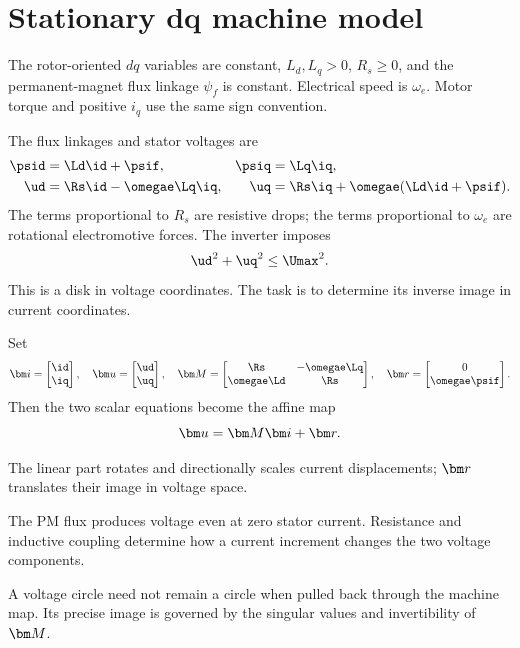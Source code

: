 \section{Stationary dq machine model}

\begin{assumption}
The rotor-oriented $dq$ variables are constant, $L_d,L_q>0$, $R_s\geq0$, and
the permanent-magnet flux linkage $\psi_f$ is constant.  Electrical speed is
$\omega_e$.  Motor torque and positive $i_q$ use the same sign convention.
\end{assumption}

The flux linkages and stator voltages are
\begin{align}
 \psid&=\Ld\id+\psif, & \psiq&=\Lq\iq,\label{eq:psm-flux}\\
 \ud&=\Rs\id-\omegae\Lq\iq, &
 \uq&=\Rs\iq+\omegae(\Ld\id+\psif).\label{eq:psm-voltage-model}
\end{align}
The terms proportional to $R_s$ are resistive drops; the terms proportional
to $\omega_e$ are rotational electromotive forces.  The inverter imposes
\begin{equation}
 \ud^2+\uq^2\leq\Umax^2.\label{eq:voltage-ball}
\end{equation}
This is a disk in voltage coordinates.  The task is to determine its inverse
image in current coordinates.

Set
\begin{equation}
 \current=\begin{bmatrix}\id\\\iq\end{bmatrix},\quad
 \voltage=\begin{bmatrix}\ud\\\uq\end{bmatrix},\quad
 \Apsm=\begin{bmatrix}\Rs&-\omegae\Lq\\
             \omegae\Ld&\Rs\end{bmatrix},\quad
 \vect{r}=\begin{bmatrix}0\\\omegae\psif\end{bmatrix}.
\end{equation}
Then the two scalar equations become the affine map
\begin{equation}
 \voltage=\Apsm\current+\vect{r}.\label{eq:affine-map}
\end{equation}

\geointerpretation The linear part rotates and directionally scales current
displacements; $\vect r$ translates their image in voltage space.

\physinterpretation The PM flux produces voltage even at zero stator current.
Resistance and inductive coupling determine how a current increment changes
the two voltage components.

\engineeringconsequence A voltage circle need not remain a circle when pulled
back through the machine map.  Its precise image is governed by the singular
values and invertibility of $\Apsm$.
